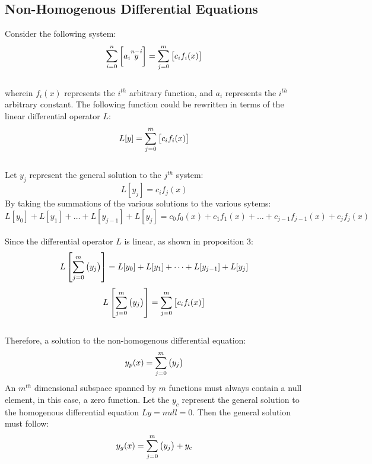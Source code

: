\documentclass[a4paper, 12pt]{report}
\begin{document}
\begin{center}
\section{Non-Homogenous Differential Equations}
\begin{comment}
\end{comment}
Consider the following system:
$$\sum_{i = 0}^{n}\left[a_i \overset{n - i}{y}\right] = \sum_{j = 0}^{m}\left[c_i f_i(x)\right]$$
\\wherein $f_i(x)$ represents the $i^{th}$ arbitrary function, and $a_i$ represents the $i^{th}$ arbitrary constant. The following function could be rewritten in terms of the linear differential operator $L$:
$$L[y] = \sum_{j = 0}^{m}\left[c_i f_i(x)\right]$$
\\Let $y_j$ represent the general solution to the $j^{th}$ system:
$$L[y_j] = c_i f_j(x)$$
By taking the summations of the various solutions to the various sytems:
$$L[y_0] + L[y_1] + \dots +L[y_{j - 1}] + L[y_j] = c_0 f_0(x) + c_1 f_1(x) + \dots + c_{j - 1} f_{j - 1}(x) + c_{j} f_j(x)$$
\\Since the differential operator $L$ is linear, as shown in proposition 3: 
$$L\left[\sum_{j = 0}^{m}\left(y_j\right)\right] = L[y_0] + L[y_1] + \dots +L[y_{j - 1}] + L[y_j]$$
$$L\left[\sum_{j = 0}^{m}\left(y_j\right)\right] =  \sum_{j = 0}^{m}\left[c_i f_i(x)\right] $$
\\Therefore, a solution to the non-homogenous differential equation:
$$y_p(x) = \sum_{j = 0}^{m}\left(y_j\right)$$ 
An $m^{th}$ dimensional subspace spanned by $m$ functions must always contain a null element, in this case, a zero function. Let the $y_c$ represent the general solution to the homogenous differential equation $Ly = null = 0$. Then the general solution must follow:
$$y_g(x) = \sum_{j = 0}^{m}\left(y_j\right) + y_c$$
\end{center}
\end{document}
